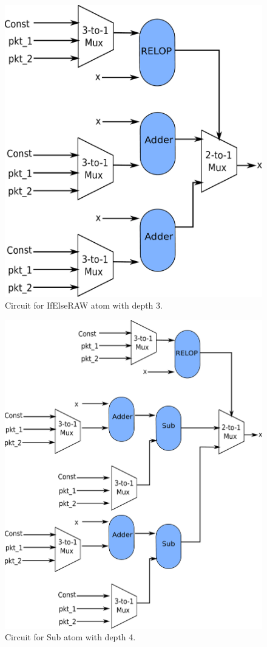 \newpage
\begin{figure}[!htbp]
  \center
  \includegraphics[width=\columnwidth]{if_else.pdf}
  \caption{Circuit for IfElseRAW atom with depth 3.}
  \label{fig:ifelseraw}
\end{figure}
\begin{figure}[!htbp]
  \center
  \includegraphics[width=\columnwidth]{sub.pdf}
  \caption{Circuit for Sub atom with depth 4.}
  \label{fig:sub}
\end{figure}

